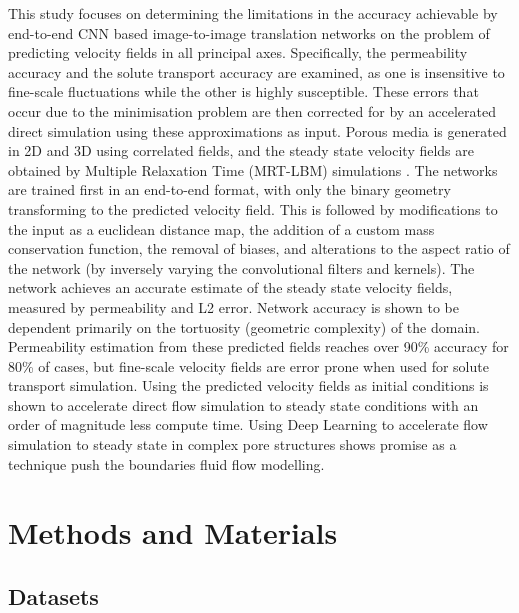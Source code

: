 \documentclass{article}
\begin{document}
This study focuses on determining the limitations in the accuracy achievable by end-to-end CNN based image-to-image translation networks on the problem of predicting velocity fields in all principal axes. Specifically, the permeability accuracy and the solute transport accuracy are examined, as one is insensitive to fine-scale fluctuations while the other is highly susceptible. These errors that occur due to the minimisation problem are then corrected for by an accelerated direct simulation using these approximations as input. Porous media is generated in 2D and 3D using correlated fields, and the steady state velocity fields are obtained by Multiple Relaxation Time (MRT-LBM) simulations \cite{MCCLURE20141865}. The networks are trained first in an end-to-end format, with only the binary geometry transforming to the predicted velocity field. This is followed by modifications to the input as a euclidean distance map, the addition of a custom mass conservation function, the removal of biases, and alterations to the aspect ratio of the network (by inversely varying the convolutional filters and kernels). The network achieves an accurate estimate of the steady state velocity fields, measured by permeability and L2 error. Network accuracy is shown to be dependent primarily on the tortuosity (geometric complexity) of the domain. Permeability estimation from these predicted fields reaches over 90\% accuracy for 80\% of cases, but fine-scale velocity fields are error prone when used for solute transport simulation. Using the predicted velocity fields as initial conditions is shown to accelerate direct flow simulation to steady state conditions with an order of magnitude less compute time. Using Deep Learning to accelerate flow simulation to steady state in complex pore structures shows promise as a technique push the boundaries fluid flow modelling.

\section{Methods and Materials}
\label{sec:methods}
\subsection{Datasets}
\label{sec:datasets}
\end{document}
